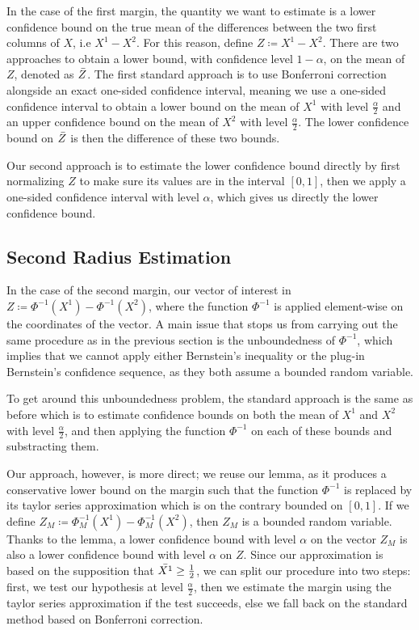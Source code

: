 In the case of the first margin, the quantity we want to estimate is a lower confidence bound on the true mean of the differences between the two first columns of $X$, i.e $X^{1}-X^{2}$.
For this reason, define $Z\coloneqq X^{1}-X^{2}$.
There are two approaches to obtain a lower bound, with confidence level $1-\alpha$, on the mean of $Z$, denoted as $\Bar{Z}$.
The first standard approach is to use Bonferroni correction alongside an exact one-sided confidence interval, meaning we use a one-sided confidence interval to obtain a lower bound on the mean of $X^1$ with level $\frac{\alpha}{2}$ and an upper confidence bound on the mean of $X^2$ with level $\frac{\alpha}{2}$.
The lower confidence bound on $\Bar{Z}$ is then the difference of these two bounds.

Our second approach is to estimate the lower confidence bound directly by first normalizing $Z$ to make sure its values are in the interval $[0,1]$, then we apply a one-sided confidence interval with level $\alpha$, which gives us directly the lower confidence bound.

\subsection{Second Radius Estimation}\label{subsec:second-radius-estimation-continuous}
In the case of the second margin, our vector of interest in $Z\coloneqq\Phi^{-1}(X^1)-\Phi^{-1}(X^2)$, where the function $\Phi^{-1}$ is applied element-wise on the coordinates of the vector.
A main issue that stops us from carrying out the same procedure as in the previous section is the unboundedness of $\Phi^{-1}$, which implies that we cannot apply either Bernstein's inequality or the plug-in Bernstein's confidence sequence, as they both assume a bounded random variable.

To get around this unboundedness problem, the standard approach is the same as before which is to estimate confidence bounds on both the mean of $X^1$ and $X^2$ with level $\frac{\alpha}{2}$, and then applying the function $\Phi^{-1}$ on each of these bounds and substracting them.

Our approach, however, is more direct; we reuse our lemma, as it produces a conservative lower bound on the margin such that the function $\Phi^{-1}$ is replaced by its taylor series approximation which is on the contrary bounded on $[0,1]$.
If we define $Z_M\coloneqq\Phi^{-1}_M(X^1)-\Phi^{-1}_M(X^2)$, then $Z_M$ is a bounded random variable.
Thanks to the lemma, a lower confidence bound with level $\alpha$ on the vector $Z_M$ is also a lower confidence bound with level $\alpha$ on $Z$.
Since our approximation is based on the supposition that $\Bar{X^1}\geq\frac{1}{2}$, we can split our procedure into two steps: first, we test our hypothesis at level $\frac{\alpha}{2}$, then we estimate the margin using the taylor series approximation if the test succeeds, else we fall back on the standard method based on Bonferroni correction.


